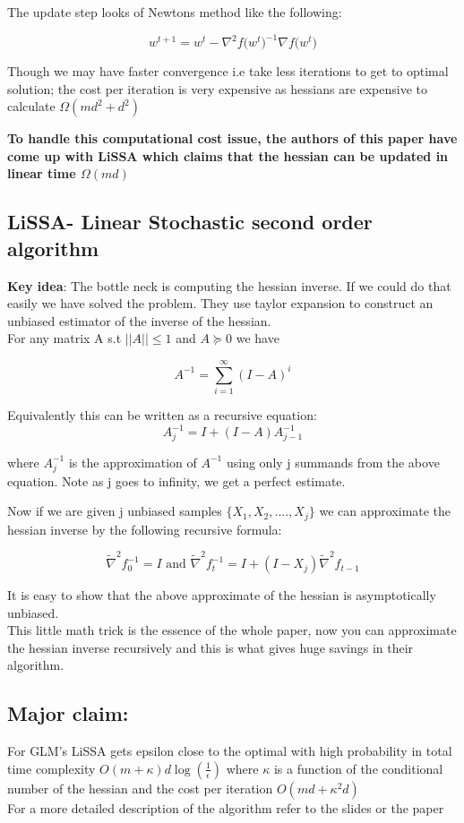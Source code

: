 \documentclass[12pt]{report}
\begin{document}
The update step looks of Newtons method like the following:

$$ w^{t+1} = w^t  - \nabla^2 f\big( w^t\big)^{-1} \nabla f\big( w^t\big)$$

Though we may have faster convergence i.e take less iterations to get to optimal solution; the cost per iteration is very expensive as hessians are expensive to calculate $\Omega(md^2 + d^2)$ \newline

\textbf{To handle this computational cost issue, the authors of this paper have come up with LiSSA which claims that the hessian can be updated in linear time $\Omega(md)$} \newline



\subsection{LiSSA- Linear Stochastic second order algorithm}

\textbf{Key idea}: The bottle neck is computing the hessian inverse. If we could do that easily we have solved the problem. 
They use taylor expansion to construct an unbiased estimator of the inverse of the hessian. \\

For any matrix A s.t $||A|| \leq 1$ and $A \succeq 0$ we have 

$$ A^{-1} = \sum_{i=1}^\infty (I - A)^i $$ 

Equivalently this can be written as a recursive equation: 
$$ A_j^{-1} = I + (I - A)A^{-1}_{j-1} $$

where $A_j^{-1}$  is the approximation of $A^{-1}$ using only j summands from the above equation. Note as j goes to infinity, we get a perfect estimate. \newline

Now if we are given j unbiased samples $\{ X_1, X_2,...., X_j\}$ we can approximate the hessian inverse by the following recursive formula:

$$ \tilde{\nabla}^2 f_0^{-1} = I \text { and } \tilde{\nabla}^2 f_t^{-1} = I + (I - X_j) \tilde{\nabla}^2 f_{t-1}$$

It is easy to show that the above approximate of the hessian is asymptotically unbiased. \\

\color{blue} This little math trick is the essence of the whole paper, now you can approximate the hessian inverse recursively and this is what gives huge savings in their algorithm\color{black}. 

\subsection{Major claim:}
For GLM's LiSSA gets epsilon close to the optimal with high probability in total time complexity $O(m + \kappa)d\log(\frac{1}{\epsilon})$ where $\kappa$ is a function of the conditional number of the hessian and the cost per iteration $O(md + \kappa^2d)$\\

For a more detailed description of the algorithm refer to the slides or the paper \newline
\end{document}
